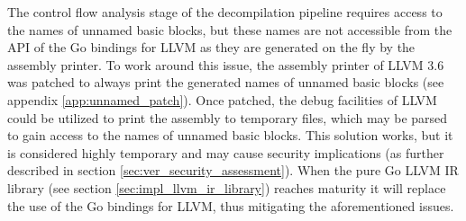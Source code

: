 The control flow analysis stage of the decompilation pipeline requires access to the names of unnamed basic blocks, but these names are not accessible from the API of the Go bindings for LLVM as they are generated on the fly by the assembly printer. To work around this issue, the assembly printer of LLVM 3.6 was patched to always print the generated names of unnamed basic blocks (see appendix \ref{app:unnamed_patch}). Once patched, the debug facilities of LLVM could be utilized to print the assembly to temporary files, which may be parsed to gain access to the names of unnamed basic blocks. This solution works, but it is considered highly temporary and may cause security implications (as further described in section \ref{sec:ver_security_assessment}). When the pure Go LLVM IR library (see section \ref{sec:impl_llvm_ir_library}) reaches maturity it will replace the use of the Go bindings for LLVM, thus mitigating the aforementioned issues.
